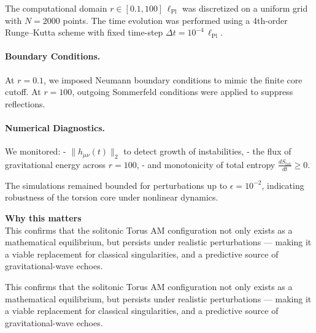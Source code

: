 \documentclass{article}
\begin{document}
The computational domain $r \in [0.1, 100]\,\ell_{\text{Pl}}$ was discretized on a uniform grid
with $N = 2000$ points. The time evolution was performed using a 4th-order Runge–Kutta scheme
with fixed time-step $\Delta t = 10^{-4}\,\ell_{\text{Pl}}$.

\paragraph{Boundary Conditions.}
At $r=0.1$, we imposed Neumann boundary conditions to mimic the finite core cutoff.
At $r=100$, outgoing Sommerfeld conditions were applied to suppress reflections.

\paragraph{Numerical Diagnostics.}
We monitored:
- $\|h_{\mu\nu}(t)\|_2$ to detect growth of instabilities,
- the flux of gravitational energy across $r=100$,
- and monotonicity of total entropy $\frac{dS_{\text{tot}}}{dt} \geq 0$.

The simulations remained bounded for perturbations up to $\epsilon = 10^{-2}$, indicating
robustness of the torsion core under nonlinear dynamics.



\begin{tcolorbox}[
  colback=white,
  colframe=black!30,
  boxrule=0.3pt,
  arc=2pt,
  left=6pt,
  right=6pt,
  top=4pt,
  bottom=4pt,
  enhanced
]
\textbf{Why this matters} \\
\vspace{2pt}
This confirms that the solitonic Torus AM configuration not only exists as a mathematical equilibrium,
but persists under realistic perturbations — making it a viable replacement for classical singularities,
and a predictive source of gravitational-wave echoes.
\end{tcolorbox}



This confirms that the solitonic Torus AM configuration not only exists as a mathematical equilibrium,
but persists under realistic perturbations — making it a viable replacement for classical singularities,
and a predictive source of gravitational-wave echoes.






\end{document}

